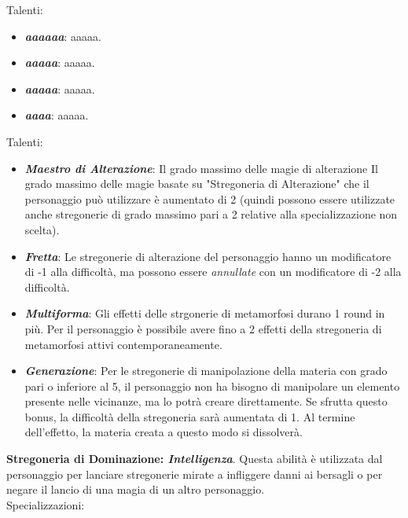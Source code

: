 \documentclass[../manuale_main.tex]{subfiles}
\begin{document}
Talenti:
\begin{itemize}
\item \textbf{\textit{aaaaaa}}: aaaaa.
\item \textbf{\textit{aaaaa}}: aaaaa.
\item \textbf{\textit{aaaaa}}: aaaaa.
\item \textbf{\textit{aaaa}}: aaaaa.
\end{itemize}

Talenti:

\begin{itemize}
\item \textbf{\textit{Maestro di Alterazione}}: Il grado massimo delle magie di alterazione Il grado massimo delle magie basate su "Stregoneria di Alterazione" che il personaggio può utilizzare è aumentato di 2 (quindi possono essere utilizzate anche stregonerie di grado massimo pari a 2 relative alla specializzazione non scelta).
\item \textbf{\textit{Fretta}}: Le stregonerie di alterazione del personaggio hanno un modificatore di -1 alla difficoltà, ma possono essere \textit{annullate} con un modificatore di -2 alla difficoltà.
\item \textbf{\textit{Multiforma}}: Gli effetti delle strgonerie di metamorfosi durano 1 round in più. Per il personaggio è possibile avere fino a 2 effetti della stregoneria di metamorfosi attivi contemporaneamente.
\item \textbf{\textit{Generazione}}: Per le stregonerie di manipolazione della materia con grado pari o inferiore al 5, il personaggio non ha bisogno di manipolare un elemento presente nelle vicinanze, ma lo potrà creare direttamente. Se sfrutta questo bonus, la difficoltà della stregoneria sarà aumentata di 1. Al termine dell'effetto, la materia creata a questo modo si dissolverà.
\end{itemize}

\textbf{Stregoneria di Dominazione: \textit{Intelligenza}}. Questa abilità è utilizzata dal personaggio per lanciare stregonerie mirate a infliggere danni ai bersagli o per negare il lancio di una magia di un altro personaggio.
\\Specializzazioni:
\end{document}
